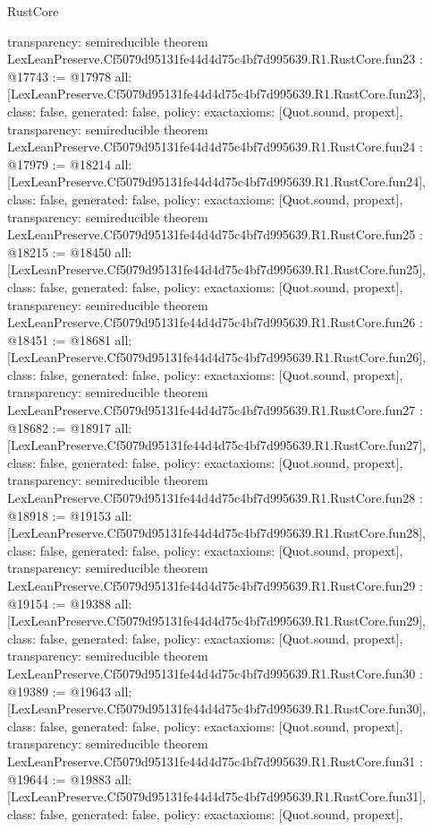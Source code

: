 \begin{lexlean}{RustCore}
\begin{coremodule}
{  transparency: semireducible
}
theorem LexLeanPreserve.Cf5079d95131fe44d4d75c4bf7d995639.R1.RustCore.fun23 : @17743 := @17978 {
  all: [LexLeanPreserve.Cf5079d95131fe44d4d75c4bf7d995639.R1.RustCore.fun23],
  class: false,
  generated: false,
  policy: exact{axioms: [Quot.sound, propext]},
  transparency: semireducible
}
theorem LexLeanPreserve.Cf5079d95131fe44d4d75c4bf7d995639.R1.RustCore.fun24 : @17979 := @18214 {
  all: [LexLeanPreserve.Cf5079d95131fe44d4d75c4bf7d995639.R1.RustCore.fun24],
  class: false,
  generated: false,
  policy: exact{axioms: [Quot.sound, propext]},
  transparency: semireducible
}
theorem LexLeanPreserve.Cf5079d95131fe44d4d75c4bf7d995639.R1.RustCore.fun25 : @18215 := @18450 {
  all: [LexLeanPreserve.Cf5079d95131fe44d4d75c4bf7d995639.R1.RustCore.fun25],
  class: false,
  generated: false,
  policy: exact{axioms: [Quot.sound, propext]},
  transparency: semireducible
}
theorem LexLeanPreserve.Cf5079d95131fe44d4d75c4bf7d995639.R1.RustCore.fun26 : @18451 := @18681 {
  all: [LexLeanPreserve.Cf5079d95131fe44d4d75c4bf7d995639.R1.RustCore.fun26],
  class: false,
  generated: false,
  policy: exact{axioms: [Quot.sound, propext]},
  transparency: semireducible
}
theorem LexLeanPreserve.Cf5079d95131fe44d4d75c4bf7d995639.R1.RustCore.fun27 : @18682 := @18917 {
  all: [LexLeanPreserve.Cf5079d95131fe44d4d75c4bf7d995639.R1.RustCore.fun27],
  class: false,
  generated: false,
  policy: exact{axioms: [Quot.sound, propext]},
  transparency: semireducible
}
theorem LexLeanPreserve.Cf5079d95131fe44d4d75c4bf7d995639.R1.RustCore.fun28 : @18918 := @19153 {
  all: [LexLeanPreserve.Cf5079d95131fe44d4d75c4bf7d995639.R1.RustCore.fun28],
  class: false,
  generated: false,
  policy: exact{axioms: [Quot.sound, propext]},
  transparency: semireducible
}
theorem LexLeanPreserve.Cf5079d95131fe44d4d75c4bf7d995639.R1.RustCore.fun29 : @19154 := @19388 {
  all: [LexLeanPreserve.Cf5079d95131fe44d4d75c4bf7d995639.R1.RustCore.fun29],
  class: false,
  generated: false,
  policy: exact{axioms: [Quot.sound, propext]},
  transparency: semireducible
}
theorem LexLeanPreserve.Cf5079d95131fe44d4d75c4bf7d995639.R1.RustCore.fun30 : @19389 := @19643 {
  all: [LexLeanPreserve.Cf5079d95131fe44d4d75c4bf7d995639.R1.RustCore.fun30],
  class: false,
  generated: false,
  policy: exact{axioms: [Quot.sound, propext]},
  transparency: semireducible
}
theorem LexLeanPreserve.Cf5079d95131fe44d4d75c4bf7d995639.R1.RustCore.fun31 : @19644 := @19883 {
  all: [LexLeanPreserve.Cf5079d95131fe44d4d75c4bf7d995639.R1.RustCore.fun31],
  class: false,
  generated: false,
  policy: exact{axioms: [Quot.sound, propext]},
}
\end{coremodule}
\end{lexlean}
